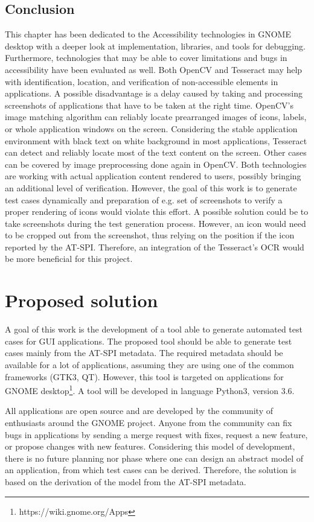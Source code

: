 \section{Conclusion}
This chapter has been dedicated to the Accessibility technologies in GNOME desktop with a deeper look at implementation, libraries, and tools for debugging. Furthermore, technologies that may be able to cover limitations and bugs in accessibility have been evaluated as well. Both OpenCV and Tesseract may help with identification, location, and verification of non-accessible elements in applications. A possible disadvantage is a delay caused by taking and processing screenshots of applications that have to be taken at the right time. OpenCV's image matching algorithm can reliably locate prearranged images of icons, labels, or whole application windows on the screen. Considering the stable application environment with black text on white background in most applications, Tesseract can detect and reliably locate most of the text content on the screen. Other cases can be covered by image preprocessing done again in OpenCV. Both technologies are working with actual application content rendered to users, possibly bringing an additional level of verification. However, the goal of this work is to generate test cases dynamically and preparation of e.g. set of screenshots to verify a proper rendering of icons would violate this effort. A possible solution could be to take screenshots during the test generation process. However, an icon would need to be cropped out from the screenshot, thus relying on the position if the icon reported by the AT-SPI. Therefore, an integration of the Tesseract's OCR would be more beneficial for this project.

\chapter{Proposed solution}
A goal of this work is the development of a tool able to generate automated test cases for GUI applications. The proposed tool should be able to generate test cases mainly from the AT-SPI metadata. The required metadata should be available for a lot of applications, assuming they are using one of the common frameworks (GTK3, QT). However, this tool is targeted on applications for GNOME desktop\footnote{https://wiki.gnome.org/Apps}. A tool will be developed in language Python3, version 3.6.

All applications are open source and are developed by the community of enthusiasts around the GNOME project. Anyone from the community can fix bugs in applications by sending a merge request with fixes, request a new feature, or propose changes with new features. Considering this model of development, there is no future planning nor phase where one can design an abstract model of an application, from which test cases can be derived. Therefore, the solution is based on the derivation of the model from the AT-SPI metadata. 

